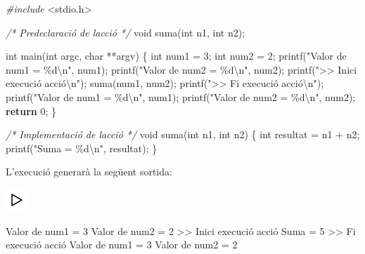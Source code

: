 \documentclass[]{book}
\newenvironment{Shaded}{\begin{snugshade}}{\end{snugshade}}
\newcommand{\CommentTok}[1]{\textcolor[rgb]{0.56,0.35,0.01}{\textit{#1}}}
\newcommand{\ControlFlowTok}[1]{\textcolor[rgb]{0.13,0.29,0.53}{\textbf{#1}}}
\newcommand{\DataTypeTok}[1]{\textcolor[rgb]{0.13,0.29,0.53}{#1}}
\newcommand{\DecValTok}[1]{\textcolor[rgb]{0.00,0.00,0.81}{#1}}
\newcommand{\ImportTok}[1]{#1}
\newcommand{\NormalTok}[1]{#1}
\newcommand{\PreprocessorTok}[1]{\textcolor[rgb]{0.56,0.35,0.01}{\textit{#1}}}
\newcommand{\SpecialCharTok}[1]{\textcolor[rgb]{0.00,0.00,0.00}{#1}}
\newcommand{\StringTok}[1]{\textcolor[rgb]{0.31,0.60,0.02}{#1}}
\begin{document}
\begin{Shaded}
\begin{Highlighting}[]
\PreprocessorTok{\#include }\ImportTok{\textless{}stdio.h\textgreater{}}

\CommentTok{/* Predeclaració de l\textquotesingle{}acció */}
\DataTypeTok{void}\NormalTok{ suma(}\DataTypeTok{int}\NormalTok{ n1, }\DataTypeTok{int}\NormalTok{ n2);}

\DataTypeTok{int}\NormalTok{ main(}\DataTypeTok{int}\NormalTok{ argc, }\DataTypeTok{char}\NormalTok{ **argv) \{}
    \DataTypeTok{int}\NormalTok{ num1 = }\DecValTok{3}\NormalTok{;}
    \DataTypeTok{int}\NormalTok{ num2 = }\DecValTok{2}\NormalTok{;}
\NormalTok{    printf(}\StringTok{"Valor de num1 = \%d}\SpecialCharTok{\textbackslash{}n}\StringTok{"}\NormalTok{, num1);}
\NormalTok{    printf(}\StringTok{"Valor de num2 = \%d}\SpecialCharTok{\textbackslash{}n}\StringTok{"}\NormalTok{, num2);}
\NormalTok{    printf(}\StringTok{"\textgreater{}\textgreater{} Inici execució acció}\SpecialCharTok{\textbackslash{}n}\StringTok{"}\NormalTok{);}
\NormalTok{    suma(num1, num2);}
\NormalTok{    printf(}\StringTok{"\textgreater{}\textgreater{} Fi execució acció}\SpecialCharTok{\textbackslash{}n}\StringTok{"}\NormalTok{);}
\NormalTok{    printf(}\StringTok{"Valor de num1 = \%d}\SpecialCharTok{\textbackslash{}n}\StringTok{"}\NormalTok{, num1);}
\NormalTok{    printf(}\StringTok{"Valor de num2 = \%d}\SpecialCharTok{\textbackslash{}n}\StringTok{"}\NormalTok{, num2);}
    \ControlFlowTok{return} \DecValTok{0}\NormalTok{;}
\NormalTok{\}   }

\CommentTok{/* Implementació de l\textquotesingle{}acció */}
\DataTypeTok{void}\NormalTok{ suma(}\DataTypeTok{int}\NormalTok{ n1, }\DataTypeTok{int}\NormalTok{ n2) \{}
    \DataTypeTok{int}\NormalTok{ resultat = n1 + n2;}
\NormalTok{    printf(}\StringTok{"Suma = \%d}\SpecialCharTok{\textbackslash{}n}\StringTok{"}\NormalTok{, resultat);}
\NormalTok{\}}
\end{Highlighting}
\end{Shaded}

L'execució generarà la següent sortida:

\includegraphics{./img/play.png}

\begin{Shaded}
\begin{Highlighting}[]
\NormalTok{Valor de num1 = }\DecValTok{3}
\NormalTok{Valor de num2 = }\DecValTok{2}
\NormalTok{\textgreater{}\textgreater{} Inici execució acció}
\NormalTok{Suma = }\DecValTok{5}
\NormalTok{\textgreater{}\textgreater{} Fi execució acció}
\NormalTok{Valor de num1 = }\DecValTok{3}
\NormalTok{Valor de num2 = }\DecValTok{2}
\end{Highlighting}
\end{Shaded}
\end{document}
